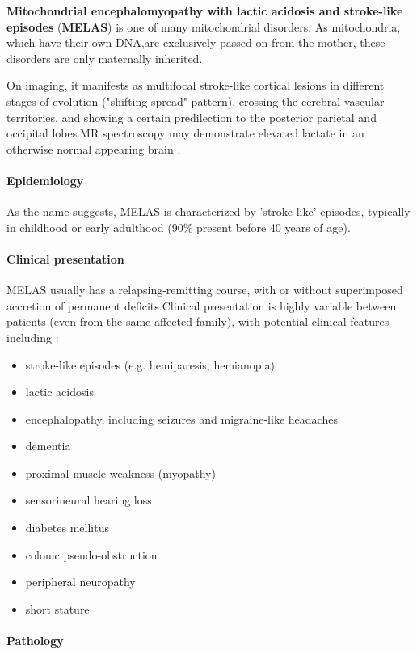 \textbf{Mitochondrial encephalomyopathy with lactic acidosis and stroke-like episodes} (\textbf{MELAS}) is one of many mitochondrial disorders. As mitochondria, which have their own DNA,are exclusively passed on from the mother, these disorders are only maternally inherited.

On imaging, it manifests as multifocal stroke-like cortical lesions in different stages of evolution ("shifting spread" pattern), crossing the cerebral vascular territories, and showing a certain predilection to the posterior parietal and occipital lobes.MR spectroscopy may demonstrate elevated lactate in an otherwise normal appearing brain .

\paragraph{Epidemiology}

As the name suggests, MELAS is characterized by 'stroke-like' episodes, typically in childhood or early adulthood (90\% present before 40 years of age).

\paragraph{Clinical presentation}

MELAS usually has a relapsing-remitting course, with or without superimposed accretion of permanent deficits.Clinical presentation is highly variable between patients (even from the same affected family), with potential clinical features including :

\begin{itemize}
	\item
	stroke-like episodes (e.g. hemiparesis, hemianopia)
	\item
	lactic acidosis
	\item
	encephalopathy, including seizures and migraine-like headaches
	\item
	dementia
	\item
	proximal muscle weakness (myopathy)
	\item
	sensorineural hearing loss
	\item
	diabetes mellitus
	\item
	colonic pseudo-obstruction
	\item
	peripheral neuropathy
	\item
	short stature
\end{itemize}

\paragraph{Pathology}

